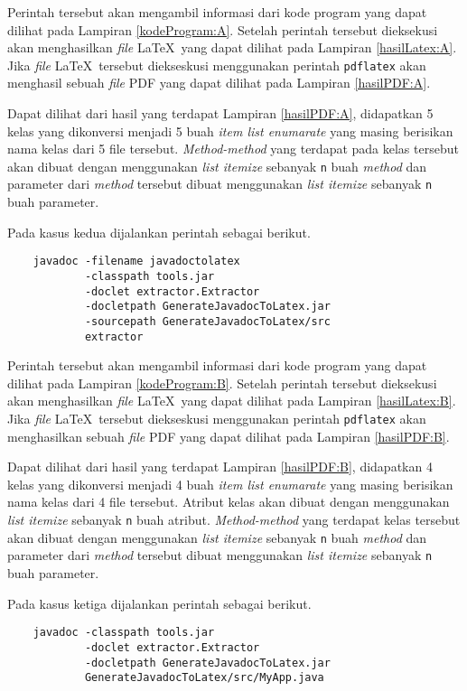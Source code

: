 Perintah tersebut akan mengambil informasi dari kode program yang dapat dilihat pada Lampiran \ref{kodeProgram:A}. Setelah perintah tersebut dieksekusi akan menghasilkan {\it file} \LaTeX\ yang dapat dilihat pada Lampiran \ref{hasilLatex:A}. Jika {\it file} \LaTeX\ tersebut diekseskusi menggunakan perintah {\tt pdflatex} akan menghasil sebuah {\it file} PDF yang dapat dilihat pada Lampiran \ref{hasilPDF:A}.

Dapat dilihat dari hasil yang terdapat Lampiran \ref{hasilPDF:A}, didapatkan 5 kelas yang dikonversi menjadi 5 buah {\it item list enumarate} yang masing berisikan nama kelas dari 5 file tersebut. {\it Method-method} yang terdapat pada kelas tersebut akan dibuat dengan menggunakan {\it list itemize} sebanyak {\tt n} buah {\it method} dan parameter dari {\it method} tersebut dibuat menggunakan {\it list itemize} sebanyak {\tt n} buah parameter.

Pada kasus kedua dijalankan perintah sebagai berikut.

\begin{verbatim}
	javadoc -filename javadoctolatex
	        -classpath tools.jar
	        -doclet extractor.Extractor
	        -docletpath GenerateJavadocToLatex.jar
	        -sourcepath GenerateJavadocToLatex/src
	        extractor
\end{verbatim}

Perintah tersebut akan mengambil informasi dari kode program yang dapat dilihat pada Lampiran \ref{kodeProgram:B}. Setelah perintah tersebut dieksekusi akan menghasilkan {\it file} \LaTeX\ yang dapat dilihat pada Lampiran \ref{hasilLatex:B}. Jika {\it file} \LaTeX\ tersebut diekseskusi menggunakan perintah {\tt pdflatex} akan menghasilkan sebuah {\it file} PDF yang dapat dilihat pada Lampiran \ref{hasilPDF:B}.

Dapat dilihat dari hasil yang terdapat Lampiran \ref{hasilPDF:B}, didapatkan 4 kelas yang dikonversi menjadi 4 buah {\it item list enumarate} yang masing berisikan nama kelas dari 4 file tersebut. Atribut kelas akan dibuat dengan menggunakan {\it list itemize} sebanyak {\tt n} buah atribut. {\it Method-method} yang terdapat kelas tersebut akan dibuat dengan menggunakan {\it list itemize} sebanyak {\tt n} buah {\it method} dan parameter dari {\it method} tersebut dibuat menggunakan {\it list itemize} sebanyak {\tt n} buah parameter.

Pada kasus ketiga dijalankan perintah sebagai berikut.

\begin{verbatim}
	javadoc -classpath tools.jar
	        -doclet extractor.Extractor
	        -docletpath GenerateJavadocToLatex.jar
	        GenerateJavadocToLatex/src/MyApp.java
\end{verbatim}

